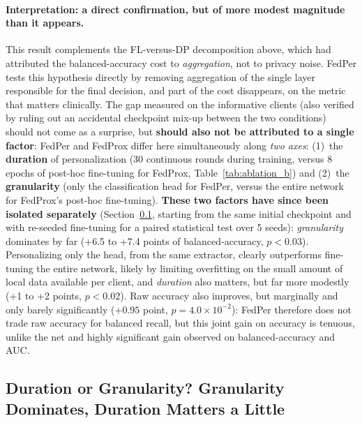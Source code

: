 \documentclass{article}
\begin{document}
\paragraph{Interpretation: a direct confirmation, but of more modest magnitude
than it appears.} This result complements the FL-versus-DP decomposition above,
which had attributed the balanced-accuracy cost to \emph{aggregation}, not to
privacy noise. FedPer tests this hypothesis directly by removing aggregation of
the single layer responsible for the final decision, and part of the cost
disappears, on the metric that matters clinically. The gap measured on the
informative clients (also verified by ruling out an accidental checkpoint mix-up
between the two conditions) should not come as a surprise, but \textbf{should
also not be attributed to a single factor}: FedPer and FedProx differ here
simultaneously along \emph{two axes}: (1)~the \textbf{duration} of
personalization (30 continuous rounds during training, versus 8 epochs of
post-hoc fine-tuning for FedProx, Table~\ref{tab:ablation_b}) and (2)~the
\textbf{granularity} (only the classification head for FedPer, versus the entire
network for FedProx's post-hoc fine-tuning). \textbf{These two factors have since
been isolated separately} (Section~\ref{subsec:duration_vs_granularity}, starting
from the same initial checkpoint and with re-seeded fine-tuning for a paired
statistical test over 5 seeds): \emph{granularity} dominates by far (+6.5 to +7.4
points of balanced-accuracy, $p<0.03$). Personalizing only the head, from the
same extractor, clearly outperforms fine-tuning the entire network, likely by
limiting overfitting on the small amount of local data available per client, and
\emph{duration} also matters, but far more modestly (+1 to +2 points, $p<0.02$).
Raw accuracy also improves, but marginally and only barely significantly
($+0.95$ point, $p=4.0\times10^{-2}$): FedPer therefore does not trade raw
accuracy for balanced recall, but this joint gain on accuracy is tenuous, unlike
the net and highly significant gain observed on balanced-accuracy and AUC.

\subsection{Duration or Granularity? Granularity Dominates, Duration Matters a
Little}
\label{subsec:duration_vs_granularity}
\end{document}

